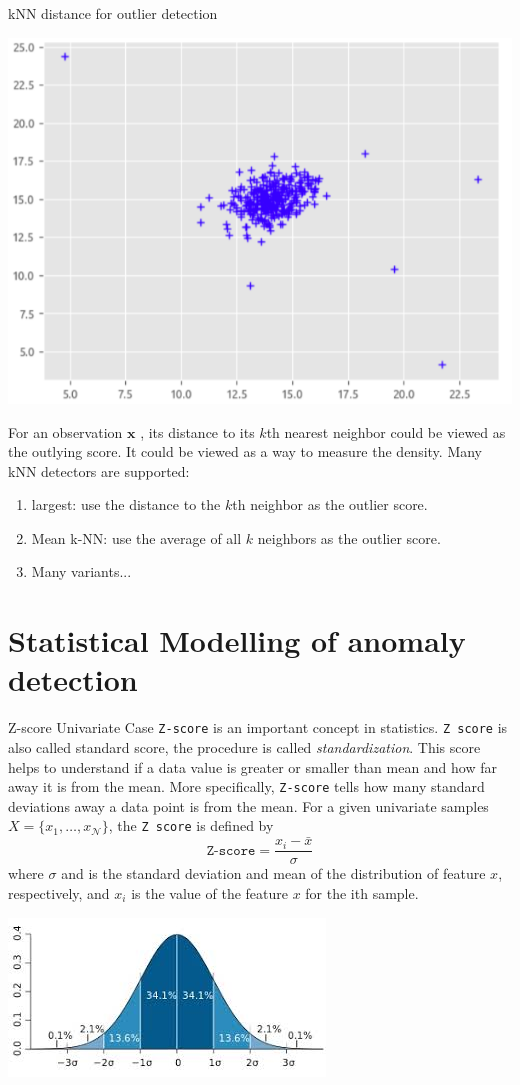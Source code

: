 \documentclass[10pt]{beamer}
\def\x{{\mathbf {x}}}
\newcommand{\vectorI}{\x}
\begin{document}
\begin{frame}{kNN distance for outlier detection}
\begin{center}
 \includegraphics[width=.45\columnwidth]{GaussianBi}
\end{center}
For an observation $\vectorI$ , its distance to its $k$th nearest neighbor could be viewed as the outlying score. It could be viewed as a way to measure the density.
Many kNN detectors are supported: 
\begin{enumerate}
\item largest: use the distance to the $k$th neighbor as the outlier score.
\item Mean k-NN: use the average of all $k$ neighbors as the outlier score.
\item Many variants...
\end{enumerate}
\end{frame}


\section{Statistical Modelling of anomaly detection}
\begin{frame}{Z-score Univariate Case}
\texttt{Z-score} is an important concept in statistics. \texttt{Z score} is also called standard score, the procedure is called \emph{standardization}. This score helps to understand if a data value is greater or smaller than mean and how far away it is from the mean. More specifically, \texttt{Z-score} tells how many standard deviations away a data point is from the mean.
For a given univariate samples $X=\{x_1,\ldots,x_\mathcal{N}\}$, the \texttt{Z score} is defined by
\begin{equation}
\texttt{Z-score}= \frac{x_i - \bar{x}}{\sigma}
\end{equation}
where $\sigma$ and  is the standard deviation and mean of the distribution of feature $x$, respectively, and $x_i$ is the value of the feature $x$ for the ith sample.
\begin{center}
 \includegraphics[width=.5\columnwidth]{zscore2}
\end{center}
\end{frame}
\end{document}
